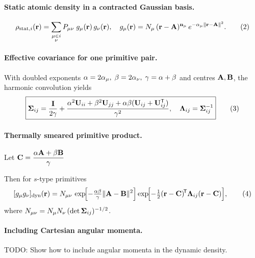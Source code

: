 \documentclass{standalone}
\begin{document}
\paragraph{Static atomic density in a contracted Gaussian basis.}
\[
\rho_{\mathrm{stat},i}(\mathbf r)=
\sum_{\substack{\mu\in i \\ \nu}}
P_{\mu\nu}\;
g_\mu(\mathbf r)\,g_\nu(\mathbf r),
\quad
g_\mu(\mathbf r)=
N_\mu\,
(\mathbf r-\mathbf A)^{\mathbf n_\mu}\,
e^{-\alpha_\mu\lVert\mathbf r-\mathbf A\rVert^{2}} .
\tag{2}
\]

\paragraph{Effective covariance for one primitive pair.}
With doubled exponents
\(
\alpha = 2\alpha_\mu,\;
\beta  = 2\alpha_\nu,\;
\gamma=\alpha+\beta
\)
and centres \(\mathbf A,\mathbf B\), the harmonic convolution yields
\[
\boxed{
\boldsymbol\Sigma_{ij}=
\frac{\mathbf I}{2\gamma}
+\frac{\alpha^{2}\mathbf U_{ii}
       +\beta^{2}\mathbf U_{jj}
       +\alpha\beta(\mathbf U_{ij}+\mathbf U_{ij}^{\mathsf T})}
      {\gamma^{2}},
\quad
\boldsymbol\Lambda_{ij}=\boldsymbol\Sigma_{ij}^{-1}}
\tag{3}
\]

\paragraph{Thermally smeared primitive product.}
Let
\(
\displaystyle
\mathbf C=\frac{\alpha\mathbf A+\beta\mathbf B}{\gamma}
\)

Then for $s$-type primitives
\[
[g_\mu g_\nu]_{\text{dyn}}(\mathbf r)=
N_{\mu\nu}\,
\exp\!\Bigl[-\tfrac{\alpha\beta}{\gamma}\lVert\mathbf A-\mathbf B\rVert^{2}\Bigr]
\exp\!\Bigl[-\tfrac12(\mathbf r-\mathbf C)^{\!\mathsf T}\boldsymbol\Lambda_{ij}(\mathbf r-\mathbf C)\Bigr],
\tag{4}
\]
where \(N_{\mu\nu}=N_\mu N_\nu\,(\det\boldsymbol\Sigma_{ij})^{-1/2}\).

\paragraph{Including Cartesian angular momenta.}

TODO: Show how to include angular momenta in the dynamic density.
\end{document}
